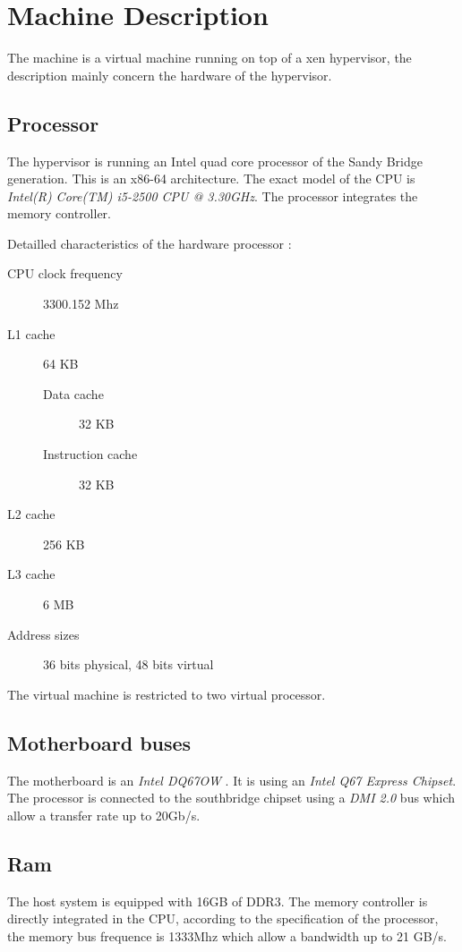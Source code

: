 \section{Machine Description}
The machine is a virtual machine running on top of a xen hypervisor, the
description mainly concern the hardware of the hypervisor.

\subsection{Processor}
The hypervisor is running an Intel quad core processor of the Sandy Bridge generation.
This is an x86-64 architecture.
The exact model of the CPU is \emph{Intel(R) Core(TM) i5-2500 CPU @ 3.30GHz}. \cite{intel-i5-2500}
The processor integrates the memory controller.

Detailled characteristics of the hardware processor :
\begin{description}
\item[CPU clock frequency] 3300.152 Mhz
\item[L1 cache] 64 KB
\begin{description}
\item[Data cache] 32 KB
\item[Instruction cache] 32 KB
\end{description}
\item[L2 cache] 256 KB
\item[L3 cache] 6 MB
\item[Address sizes] 36 bits physical, 48 bits virtual
\end{description}
The virtual machine is restricted to two virtual processor.

\subsection{Motherboard buses}
The motherboard is an \emph{Intel DQ67OW} \cite{dq670w-motherboard}. It is using an \emph{Intel Q67
Express Chipset}. \cite{q67-chipset}
The processor is connected to the southbridge chipset using a \emph{DMI 2.0} bus which
allow a transfer rate up to 20Gb/s.

\subsection{Ram}
The host system is equipped with 16GB of DDR3.
The memory controller is directly integrated in the CPU, according to the
specification of the processor, the memory bus frequence is 1333Mhz which allow a bandwidth up
to 21 GB/s. \cite{intel-i5-2500}

